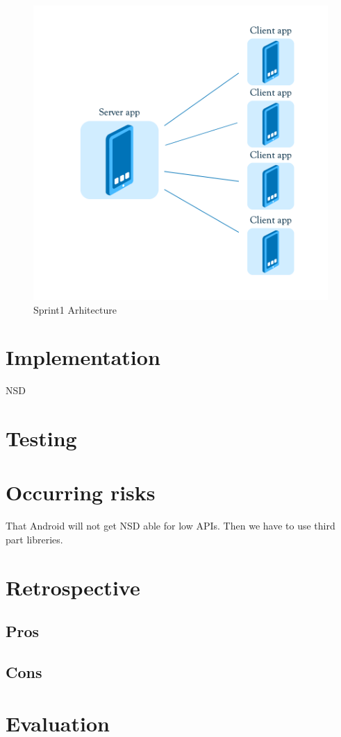 \begin{figure}[!t]
	\centering
		\includegraphics[width=16cm]{sprint1/arhitecture.png}
	\caption{Sprint1 Arhitecture}
	\label{fig:sprint1_arhitecture}
\end{figure}

\section{Implementation}

NSD
\section{Testing}

\section{Occurring risks}

That Android will not get NSD able for low APIs. 
Then we have to use third part libreries.

\section{Retrospective}
\subsection{Pros}
\subsection{Cons}
\section{Evaluation}
